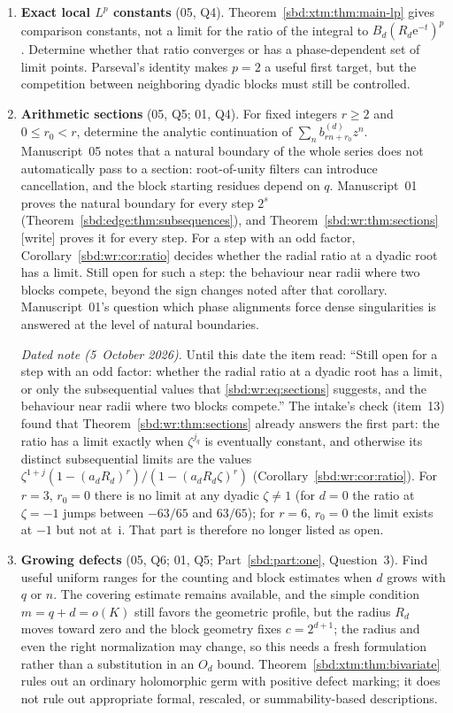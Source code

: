 \documentclass[11pt,a4paper]{article}
\theoremstyle{definition}
\newcommand{\e}{\mathrm e}
\newcommand{\ii}{\mathrm i}
\begin{document}
\begin{enumerate}[label=\textbf{\arabic*.},leftmargin=*]
\item \textbf{Exact local $L^p$ constants} (05, Q4).
Theorem~\ref{sbd:xtm:thm:main-lp} gives comparison constants, not a limit
for the ratio of the integral to $B_d(R_d\e^{-t})^p$. Determine whether that
ratio converges or has a phase-dependent set of limit points. Parseval's
identity makes $p=2$ a useful first target, but the competition between
neighboring dyadic blocks must still be controlled.

\item \textbf{Arithmetic sections} (05, Q5; 01, Q4). For fixed integers
$r\ge2$ and $0\le r_0<r$, determine the analytic continuation of
$\sum_nb_{rn+r_0}^{(d)}z^n$. Manuscript~05 notes that a natural boundary of
the whole series does not automatically pass to a section: root-of-unity
filters can introduce cancellation, and the block starting residues depend
on $q$. Manuscript~01 proves the natural boundary for every step $2^s$
(Theorem~\ref{sbd:edge:thm:subsequences}), and
Theorem~\ref{sbd:wr:thm:sections} [write] proves it for every step. For a
step with an odd factor, Corollary~\ref{sbd:wr:cor:ratio} decides whether
the radial ratio at a dyadic root has a limit. Still open for such a step:
the behaviour near radii where two blocks compete, beyond the sign changes
noted after that corollary. Manuscript~01's question which phase alignments
force dense singularities is answered at the level of natural boundaries.

\emph{Dated note (5~October 2026).} Until this date the item read: ``Still
open for a step with an odd factor: whether the radial ratio at a dyadic
root has a limit, or only the subsequential values that
\eqref{sbd:wr:eq:sections} suggests, and the behaviour near radii where two
blocks compete.'' The intake's check (item~13) found that
Theorem~\ref{sbd:wr:thm:sections} already answers the first part: the ratio
has a limit exactly when $\zeta^{j_q}$ is eventually constant, and otherwise
its distinct subsequential limits are the values
$\zeta^{1+j}(1-(a_dR_d)^r)/(1-(a_dR_d\zeta)^r)$
(Corollary~\ref{sbd:wr:cor:ratio}). For $r=3$, $r_0=0$ there is no limit
at any dyadic $\zeta\ne1$ (for $d=0$ the ratio at $\zeta=-1$ jumps between
$-63/65$ and $63/65$); for $r=6$, $r_0=0$ the limit exists at $-1$ but not
at~$\ii$. That part is therefore no longer listed as open.

\item \textbf{Growing defects} (05, Q6; 01, Q5; Part~\ref{sbd:part:one},
Question~3). Find useful uniform ranges for the counting and block
estimates when $d$ grows with $q$ or $n$. The covering estimate remains
available, and the simple condition $m=q+d=o(K)$ still favors the geometric
profile, but the radius $R_d$ moves toward zero and the block geometry fixes
$c=2^{d+1}$; the radius and even the right normalization may change, so
this needs a fresh formulation rather than a substitution in an $O_d$
bound. Theorem~\ref{sbd:xtm:thm:bivariate} rules out an ordinary
holomorphic germ with positive defect marking; it does not rule out
appropriate formal, rescaled, or summability-based descriptions.


\end{enumerate}
\end{document}
